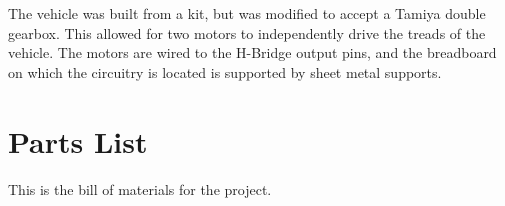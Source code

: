 \documentclass[12pt]{article}
\begin{document}
The vehicle was built from a kit, but was modified to accept a Tamiya double gearbox.  This allowed for two motors to independently drive the treads of the vehicle.  The motors are wired to the H-Bridge output pins, and the breadboard on which the circuitry is located is supported by sheet metal supports.

\section{Parts List}
This is the bill of materials for the project.
\end{document}
